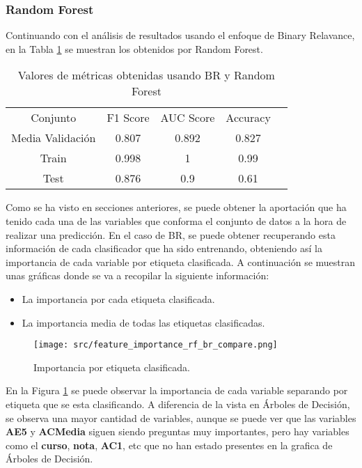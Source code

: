 \subsubsection*{Random Forest}
Continuando con el análisis de resultados usando el enfoque de Binary Relavance, en la Tabla \ref{tab:ml_tab_rf} se muestran los obtenidos por Random Forest.
\begin{table}[H]
	\centering
	\begin{tabular}{|c|c|c|c|c}
		\cline{1-4}
		Conjunto         & F1 Score & AUC Score & Accuracy \\ \cline{1-4}
		Media Validación & 0.807    & 0.892     & 0.827    \\ \cline{1-4}
		Train            & 0.998    & 1         & 0.99     \\ \cline{1-4}
		Test             & 0.876    & 0.9       & 0.61     \\ \cline{1-4}
	\end{tabular}
	\caption{Valores de métricas obtenidas usando BR y Random Forest}
	\label{tab:ml_tab_rf}
\end{table}
Como se ha visto en secciones anteriores, se puede obtener la aportación que ha tenido cada una de las variables que conforma el conjunto de datos a la hora de realizar una predicción. En el caso de BR, se puede obtener recuperando esta información de cada clasificador que ha sido entrenando, obteniendo así la importancia de cada variable por etiqueta clasificada.
A continuación se muestran unas gráficas donde se va a recopilar la siguiente información: \linebreak
\begin{itemize}
	\item La importancia por cada etiqueta clasificada.
	\item La importancia media de todas las etiquetas clasificadas.
\end{itemize}
\begin{figure}[H]
	\centering
	\texttt{[image: src/feature\_importance\_rf\_br\_compare.png]}
	\caption{Importancia por etiqueta clasificada.}
	\label{fig:rf_br_label}
\end{figure}
En la Figura \ref{fig:rf_br_label} se puede observar la importancia de cada variable separando por etiqueta que se esta clasificando. A diferencia de la vista en Árboles de Decisión, se observa una mayor cantidad de variables, aunque se puede ver que las variables \textbf{AE5} y \textbf{ACMedia} siguen siendo preguntas muy importantes, pero hay variables como el \textbf{curso}, \textbf{nota}, \textbf{AC1}, etc que no han estado presentes en la grafica de Árboles de Decisión.
